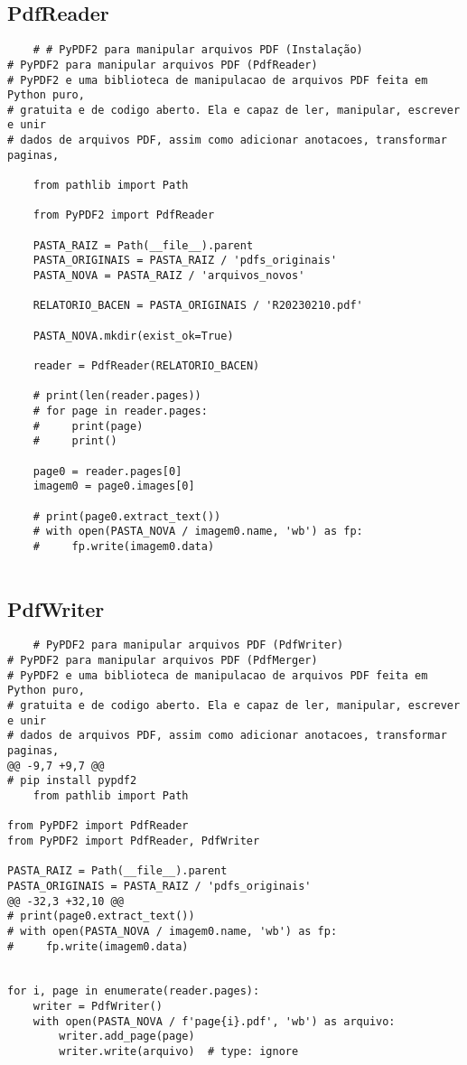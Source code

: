 \documentclass{article}
\begin{document}
\subsection{PdfReader}
\begin{lstlisting}
    # # PyPDF2 para manipular arquivos PDF (Instalação)
# PyPDF2 para manipular arquivos PDF (PdfReader)
# PyPDF2 e uma biblioteca de manipulacao de arquivos PDF feita em Python puro,
# gratuita e de codigo aberto. Ela e capaz de ler, manipular, escrever e unir
# dados de arquivos PDF, assim como adicionar anotacoes, transformar paginas,
    
    from pathlib import Path

    from PyPDF2 import PdfReader
    
    PASTA_RAIZ = Path(__file__).parent
    PASTA_ORIGINAIS = PASTA_RAIZ / 'pdfs_originais'
    PASTA_NOVA = PASTA_RAIZ / 'arquivos_novos'
    
    RELATORIO_BACEN = PASTA_ORIGINAIS / 'R20230210.pdf'
    
    PASTA_NOVA.mkdir(exist_ok=True)
    
    reader = PdfReader(RELATORIO_BACEN)
    
    # print(len(reader.pages))
    # for page in reader.pages:
    #     print(page)
    #     print()
    
    page0 = reader.pages[0]
    imagem0 = page0.images[0]
    
    # print(page0.extract_text())
    # with open(PASTA_NOVA / imagem0.name, 'wb') as fp:
    #     fp.write(imagem0.data)


\end{lstlisting}

\subsection{PdfWriter}
\begin{lstlisting}
    # PyPDF2 para manipular arquivos PDF (PdfWriter)
# PyPDF2 para manipular arquivos PDF (PdfMerger)
# PyPDF2 e uma biblioteca de manipulacao de arquivos PDF feita em Python puro,
# gratuita e de codigo aberto. Ela e capaz de ler, manipular, escrever e unir
# dados de arquivos PDF, assim como adicionar anotacoes, transformar paginas,
@@ -9,7 +9,7 @@
# pip install pypdf2
    from pathlib import Path

from PyPDF2 import PdfReader
from PyPDF2 import PdfReader, PdfWriter

PASTA_RAIZ = Path(__file__).parent
PASTA_ORIGINAIS = PASTA_RAIZ / 'pdfs_originais'
@@ -32,3 +32,10 @@
# print(page0.extract_text())
# with open(PASTA_NOVA / imagem0.name, 'wb') as fp:
#     fp.write(imagem0.data)


for i, page in enumerate(reader.pages):
    writer = PdfWriter()
    with open(PASTA_NOVA / f'page{i}.pdf', 'wb') as arquivo:
        writer.add_page(page)
        writer.write(arquivo)  # type: ignore

\end{lstlisting}
\end{document}
